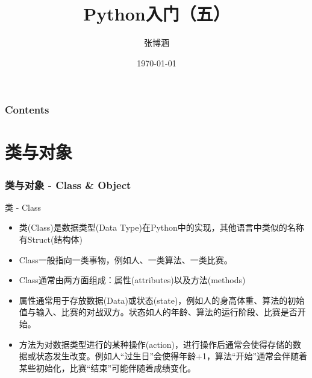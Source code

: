 \documentclass[9pt]{beamer}
\title{Python入门（五）}
\author{张博涵}
\institute{北京航空航天大学}
\date{\today}
\begin{document}
\begin{frame}[plain]
\maketitle
\end{frame}

\begin{frame}
    \frametitle{Contents}

    \tableofcontents

\end{frame}

\section{类与对象}

\begin{frame}
    \frametitle{类与对象 - Class \& Object}
    \begin{block}{类 - Class}
    \begin{itemize}
        \item 类(Class)是数据类型(Data Type)在Python中的实现，其他语言中类似的名称有Struct(结构体)
        \item Class一般指向一类事物，例如人、一类算法、一类比赛。
        \item Class通常由两方面组成：属性(attributes)以及方法(methods)
        \item 属性通常用于存放数据(Data)或状态(state)，例如人的身高体重、算法的初始值与输入、比赛的对战双方。状态如人的年龄、算法的运行阶段、比赛是否开始。
        \item 方法为对数据类型进行的某种操作(action)，进行操作后通常会使得存储的数据或状态发生改变。例如人``过生日''会使得年龄+1，算法``开始''通常会伴随着某些初始化，比赛``结束''可能伴随着成绩变化。
    \end{itemize}
    \end{block}

\end{frame}
\end{document}
